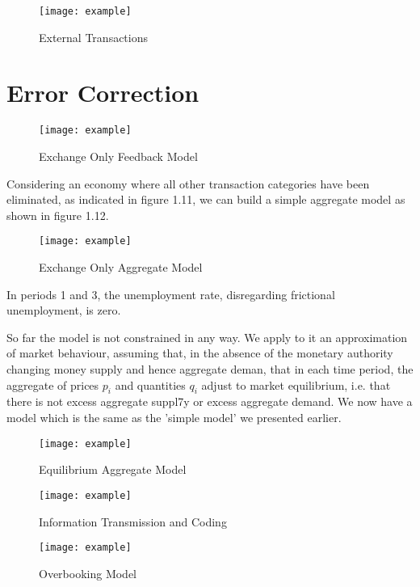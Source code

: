 \begin{figure}
\centering
\texttt{[image: example]}
\caption{External Transactions}
\label{fig:external_transactions}
\end{figure}

\section{Error Correction}

\begin{figure}
\centering
\texttt{[image: example]}
\caption{Exchange Only Feedback Model}
\label{fig:exchange_only_feedback_schema}
\end{figure}

Considering an economy where all other transaction categories have been eliminated, as
indicated in figure 1.11, we can build a simple aggregate model as shown in figure 1.12.

\begin{figure}
\centering
\texttt{[image: example]}
\caption{Exchange Only Aggregate Model}
\label{fig:exchange_only_aggregate_model}
\end{figure}

In periods 1 and 3, the unemployment rate, disregarding frictional unemployment, is zero.

So far the model is not constrained in any way. We apply to it an approximation of market behaviour,
assuming that, in the absence of the monetary authority changing money supply and hence aggregate
deman, that in each time period, the aggregate of prices \(p_i\) and quantities \(q_i\) adjust to
market equilibrium, i.e. that there is not excess aggregate suppl7y or excess aggregate demand. We
now have a model which is the same as the 'simple model' we presented earlier.

\begin{figure}
\centering
\texttt{[image: example]}
\caption{Equilibrium Aggregate Model}
\label{fig:equilibrium_aggregate_model}
\end{figure}

\begin{figure}
\centering
\texttt{[image: example]}
\caption{Information Transmission and Coding}
\label{fig:information_transmission}
\end{figure}

\begin{figure}
\centering
\texttt{[image: example]}
\caption{Overbooking Model}
\label{fig:overbooking}
\end{figure}

